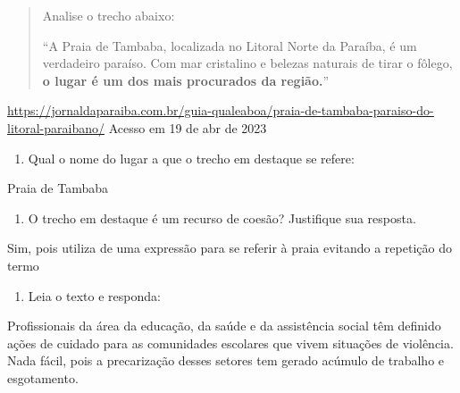 {


\begin{quote}
Analise o trecho abaixo:

``A Praia de Tambaba, localizada no Litoral Norte da Paraíba, é um
verdadeiro paraíso. Com mar cristalino e belezas naturais de tirar o
fôlego, \textbf{o lugar é um dos mais procurados da região.}''
\end{quote}

\href{https://jornaldaparaiba.com.br/guia-qualeaboa/praia-de-tambaba-paraiso-do-litoral-paraibano/}{\uline{https://jornaldaparaiba.com.br/guia-qualeaboa/praia-de-tambaba-paraiso-do-litoral-paraibano/}}
Acesso em 19 de abr de 2023

\begin{enumerate}
\def\labelenumi{\arabic{enumi})}
\tightlist
\item
  Qual o nome do lugar a que o trecho em destaque se refere:
\end{enumerate}

Praia de Tambaba

\begin{enumerate}
\def\labelenumi{\arabic{enumi})}
\setcounter{enumi}{1}
\tightlist
\item
  O trecho em destaque é um recurso de coesão? Justifique sua resposta.
\end{enumerate}

Sim, pois utiliza de uma expressão para se referir à praia evitando a
repetição do termo

\begin{enumerate}
\def\labelenumi{\arabic{enumi})}
\setcounter{enumi}{2}
\tightlist
\item
  Leia o texto e responda:
\end{enumerate}

Profissionais da área da educação, da saúde e da assistência social têm
definido ações de cuidado para as comunidades escolares que vivem
situações de violência. Nada fácil, pois a precarização desses setores
tem gerado acúmulo de trabalho e esgotamento.

}
